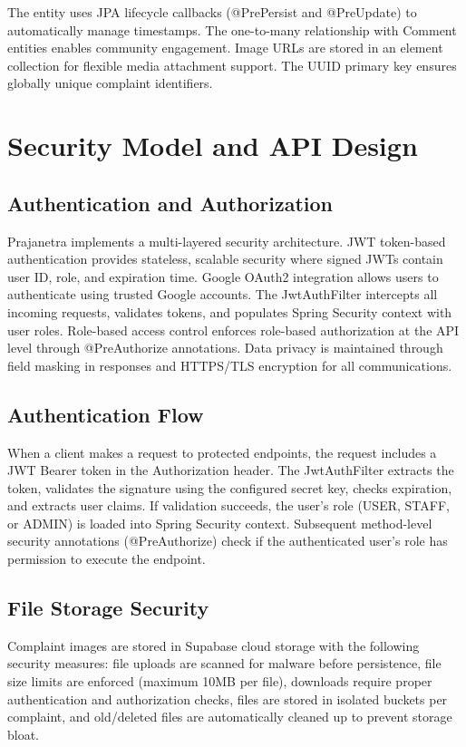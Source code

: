 \documentclass[12pt,a4paper]{report}
\begin{document}
The entity uses JPA lifecycle callbacks (@PrePersist and @PreUpdate) to automatically manage timestamps. The one-to-many relationship with Comment entities enables community engagement. Image URLs are stored in an element collection for flexible media attachment support. The UUID primary key ensures globally unique complaint identifiers.


\chapter{Security Model and API Design}

\section{Authentication and Authorization}
Prajanetra implements a multi-layered security architecture. JWT token-based authentication provides stateless, scalable security where signed JWTs contain user ID, role, and expiration time. Google OAuth2 integration allows users to authenticate using trusted Google accounts. The JwtAuthFilter intercepts all incoming requests, validates tokens, and populates Spring Security context with user roles. Role-based access control enforces role-based authorization at the API level through @PreAuthorize annotations. Data privacy is maintained through field masking in responses and HTTPS/TLS encryption for all communications.

\section{Authentication Flow}
When a client makes a request to protected endpoints, the request includes a JWT Bearer token in the Authorization header. The JwtAuthFilter extracts the token, validates the signature using the configured secret key, checks expiration, and extracts user claims. If validation succeeds, the user's role (USER, STAFF, or ADMIN) is loaded into Spring Security context. Subsequent method-level security annotations (@PreAuthorize) check if the authenticated user's role has permission to execute the endpoint.

\section{File Storage Security}
Complaint images are stored in Supabase cloud storage with the following security measures: file uploads are scanned for malware before persistence, file size limits are enforced (maximum 10MB per file), downloads require proper authentication and authorization checks, files are stored in isolated buckets per complaint, and old/deleted files are automatically cleaned up to prevent storage bloat.
\end{document}
